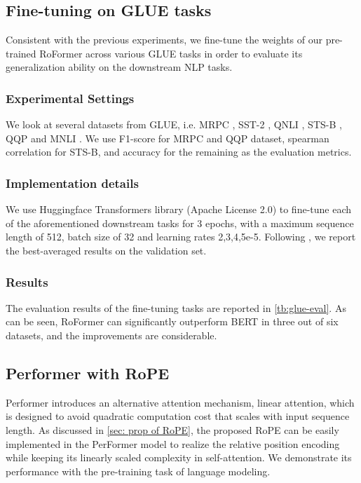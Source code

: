 \subsection{Fine-tuning on GLUE tasks}\label{subsec:glue}
Consistent with the previous experiments, we fine-tune the weights of our pre-trained RoFormer across various GLUE tasks in order to evaluate its generalization ability on the downstream NLP tasks. 

\subsubsection{Experimental Settings} We look at several datasets from GLUE, i.e. MRPC \cite{mrpc}, SST-2 \cite{sst2}, QNLI \cite{qnli}, STS-B \cite{stsb}, QQP \cite{qqp} and MNLI \cite{mnli}. We use F1-score for MRPC and QQP dataset, spearman correlation for STS-B, and accuracy for the remaining as the evaluation metrics.

\subsubsection{Implementation details} We use Huggingface Transformers library (Apache License 2.0)\cite{wolf-etal-2020-transformers} to fine-tune each of the aforementioned downstream tasks for 3 epochs, with a maximum sequence length of 512, batch size of 32 and learning rates {2,3,4,5}e-5. Following \cite{Devlin2019BERTPO},  we report the best-averaged results on the validation set.

\subsubsection{Results} 
The evaluation results of the fine-tuning tasks are reported in \ref{tb:glue-eval}. As can be seen, RoFormer can significantly outperform  BERT in three out of six datasets, and the improvements are considerable. 

\subsection{Performer with RoPE}\label{subsec:peformer}
Performer \cite{performer} introduces an alternative attention mechanism, linear attention, which is designed to avoid quadratic computation cost that scales with input sequence length. As discussed in \ref{sec: prop of RoPE}, the proposed RoPE can be easily implemented in the PerFormer model to realize the relative position encoding while keeping its linearly scaled complexity in self-attention. We  demonstrate its performance with  the pre-training task of language modeling.

